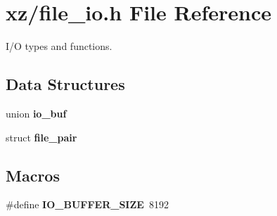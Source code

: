 \section{xz/file\-\_\-io.h File Reference}
\label{file__io_8h}


I/\-O types and functions.  


\subsection*{Data Structures}
\begin{DoxyCompactItemize}
\item 
union {\bf io\-\_\-buf}
\item 
struct {\bf file\-\_\-pair}
\end{DoxyCompactItemize}
\subsection*{Macros}
\begin{DoxyCompactItemize}
\item 
\#define {\bfseries I\-O\-\_\-\-B\-U\-F\-F\-E\-R\-\_\-\-S\-I\-Z\-E}~8192\label{file__io_8h_abe5d3c90538920357e5f36e108e5dcaa}

\end{DoxyCompactItemize}
